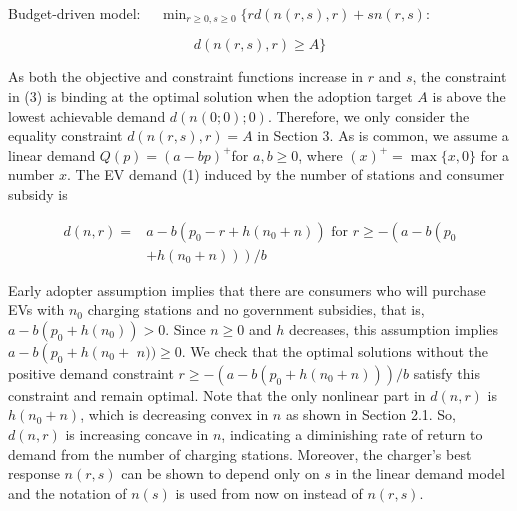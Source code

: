 \documentclass[10pt]{article}
\begin{document}
Budget-driven model: $\quad \min _{r \geq 0, s \geq 0}\{r d(n(r, s), r)+s n(r, s):$


\begin{equation*}
d(n(r, s), r) \geq A\} \tag{3}
\end{equation*}


As both the objective and constraint functions increase in $r$ and $s$, the constraint in (3) is binding at the optimal solution when the adoption target $A$ is above the lowest achievable demand $d(n(0 ; 0) ; 0)$. Therefore, we only consider the equality constraint $d(n(r, s), r)=A$ in Section 3. As is common, we assume a linear demand $Q(p)=(a-b p)^{+}$for $a, b \geq 0$, where $(x)^{+}=\max \{x, 0\}$ for a number $x$. The EV demand (1) induced by the number of stations and consumer subsidy is


\begin{align*}
d(n, r)= & a-b\left(p_{0}-r+h\left(n_{0}+n\right)\right) \text { for } r \geq-\left(a-b\left(p_{0}\right.\right. \\
& \left.\left.+h\left(n_{0}+n\right)\right)\right) / b \tag{4}
\end{align*}


Early adopter assumption implies that there are consumers who will purchase EVs with $n_{0}$ charging stations and no government subsidies, that is, $a-b\left(p_{0}+h\left(n_{0}\right)\right)>0$. Since $n \geq 0$ and $h$ decreases, this assumption implies $a-b\left(p_{0}+h\left(n_{0}+\right.\right.$ $n)) \geq 0$. We check that the optimal solutions without the positive demand constraint $r \geq-\left(a-b\left(p_{0}+h\left(n_{0}+n\right)\right)\right) / b$ satisfy this constraint and remain optimal. Note that the only nonlinear part in $d(n, r)$ is $h\left(n_{0}+n\right)$, which is decreasing convex in $n$ as shown in Section 2.1. So, $d(n, r)$ is increasing concave in $n$, indicating a diminishing rate of return to demand from the number of charging stations. Moreover, the charger's best response $n(r, s)$ can be shown to depend only on $s$ in the linear demand model and the notation of $n(s)$ is used from now on instead of $n(r, s)$.
\end{document}
